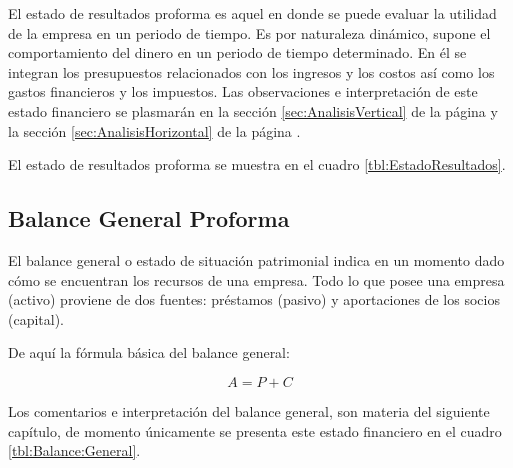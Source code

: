 El estado de resultados proforma es aquel en donde se puede evaluar la utilidad de la empresa en un periodo de tiempo. Es por naturaleza dinámico, supone el comportamiento del dinero en un periodo de tiempo determinado. En él se integran los presupuestos relacionados con los ingresos y los costos así como los gastos financieros y los impuestos. Las observaciones e interpretación de este estado financiero se plasmarán en la sección \ref{sec:AnalisisVertical} de la página \pageref{sec:AnalisisVertical} y la sección \ref{sec:AnalisisHorizontal} de la página \pageref{sec:AnalisisHorizontal}.

El estado de resultados proforma se muestra en el cuadro \ref{tbl:EstadoResultados}.

\subsection{Balance General Proforma}

El balance general o estado de situación patrimonial indica en un momento dado cómo se encuentran los recursos de una empresa. Todo lo que posee una empresa (activo) proviene de dos fuentes: préstamos (pasivo) y aportaciones de los socios (capital).

De aquí la fórmula básica del balance general:

$$ A = P + C $$

Los comentarios e interpretación del balance general, son materia del siguiente capítulo, de momento únicamente se presenta este estado financiero en el cuadro \ref{tbl:Balance:General}.




